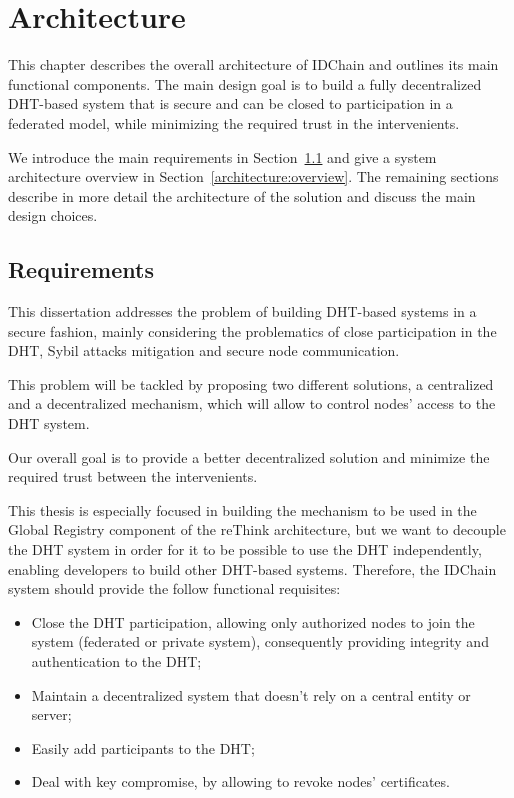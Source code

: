 \chapter{Architecture}
\label{chapter:architecture}

This chapter describes the overall architecture of IDChain and outlines its main functional components.
The main design goal is to build a fully decentralized DHT-based system that is secure and can be closed to participation in a federated model, while minimizing the required trust in the intervenients.

We introduce the main requirements in Section~\ref{architecture:requirements} and give a system architecture overview in Section~\ref{architecture:overview}.
The remaining sections describe in more detail the architecture of the solution and discuss the main design choices.

\section{Requirements}\label{architecture:requirements}

This dissertation addresses the problem of building DHT-based systems in a secure fashion, mainly considering the problematics of close participation in the DHT, Sybil attacks mitigation and secure node communication.

This problem will be tackled by proposing two different solutions, a centralized and a decentralized mechanism, which will allow to control nodes' access to the DHT system.

Our overall goal is to provide a better decentralized solution and minimize the required trust between the intervenients.

This thesis is especially focused in building the mechanism to be used in the Global Registry component of the reThink architecture, but we want to decouple the DHT system in order for it to be possible to use the DHT independently, enabling developers to build other DHT-based systems.
Therefore, the IDChain system should provide the follow functional requisites:

\begin{itemize}
  \item Close the DHT participation, allowing only authorized nodes to join the system (federated or private system), consequently providing integrity and authentication to the DHT;
  \item Maintain a decentralized system that doesn't rely on a central entity or server;
  \item Easily add participants to the DHT;
  \item Deal with key compromise, by allowing to revoke nodes' certificates.
\end{itemize}


